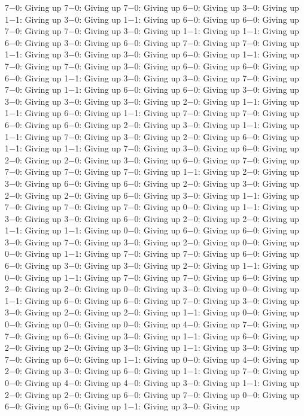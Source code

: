 7−0: Giving up
7−0: Giving up
7−0: Giving up
6−0: Giving up
3−0: Giving up
1−1: Giving up
3−0: Giving up
1−1: Giving up
6−0: Giving up
6−0: Giving up
7−0: Giving up
7−0: Giving up
3−0: Giving up
1−1: Giving up
1−1: Giving up
6−0: Giving up
3−0: Giving up
6−0: Giving up
7−0: Giving up
7−0: Giving up
1−1: Giving up
3−0: Giving up
3−0: Giving up
6−0: Giving up
1−1: Giving up
7−0: Giving up
7−0: Giving up
3−0: Giving up
6−0: Giving up
6−0: Giving up
6−0: Giving up
1−1: Giving up
3−0: Giving up
3−0: Giving up
7−0: Giving up
7−0: Giving up
1−1: Giving up
6−0: Giving up
6−0: Giving up
3−0: Giving up
3−0: Giving up
3−0: Giving up
3−0: Giving up
2−0: Giving up
1−1: Giving up
1−1: Giving up
6−0: Giving up
1−1: Giving up
7−0: Giving up
7−0: Giving up
6−0: Giving up
6−0: Giving up
2−0: Giving up
3−0: Giving up
1−1: Giving up
1−1: Giving up
7−0: Giving up
3−0: Giving up
2−0: Giving up
6−0: Giving up
1−1: Giving up
1−1: Giving up
7−0: Giving up
3−0: Giving up
6−0: Giving up
2−0: Giving up
2−0: Giving up
3−0: Giving up
6−0: Giving up
7−0: Giving up
7−0: Giving up
7−0: Giving up
7−0: Giving up
1−1: Giving up
2−0: Giving up
3−0: Giving up
6−0: Giving up
6−0: Giving up
2−0: Giving up
3−0: Giving up
2−0: Giving up
2−0: Giving up
6−0: Giving up
3−0: Giving up
1−1: Giving up
7−0: Giving up
7−0: Giving up
7−0: Giving up
0−0: Giving up
1−1: Giving up
3−0: Giving up
3−0: Giving up
6−0: Giving up
2−0: Giving up
2−0: Giving up
1−1: Giving up
1−1: Giving up
0−0: Giving up
6−0: Giving up
6−0: Giving up
3−0: Giving up
7−0: Giving up
3−0: Giving up
2−0: Giving up
0−0: Giving up
0−0: Giving up
1−1: Giving up
7−0: Giving up
7−0: Giving up
6−0: Giving up
6−0: Giving up
3−0: Giving up
3−0: Giving up
2−0: Giving up
1−1: Giving up
0−0: Giving up
1−1: Giving up
7−0: Giving up
7−0: Giving up
6−0: Giving up
2−0: Giving up
2−0: Giving up
0−0: Giving up
3−0: Giving up
0−0: Giving up
1−1: Giving up
6−0: Giving up
6−0: Giving up
7−0: Giving up
3−0: Giving up
3−0: Giving up
2−0: Giving up
2−0: Giving up
1−1: Giving up
0−0: Giving up
0−0: Giving up
0−0: Giving up
0−0: Giving up
4−0: Giving up
7−0: Giving up
7−0: Giving up
6−0: Giving up
3−0: Giving up
1−1: Giving up
6−0: Giving up
2−0: Giving up
2−0: Giving up
3−0: Giving up
1−1: Giving up
3−0: Giving up
7−0: Giving up
6−0: Giving up
1−1: Giving up
0−0: Giving up
4−0: Giving up
2−0: Giving up
3−0: Giving up
6−0: Giving up
1−1: Giving up
7−0: Giving up
0−0: Giving up
4−0: Giving up
4−0: Giving up
3−0: Giving up
1−1: Giving up
2−0: Giving up
2−0: Giving up
6−0: Giving up
7−0: Giving up
0−0: Giving up
6−0: Giving up
6−0: Giving up
1−1: Giving up
3−0: Giving up
